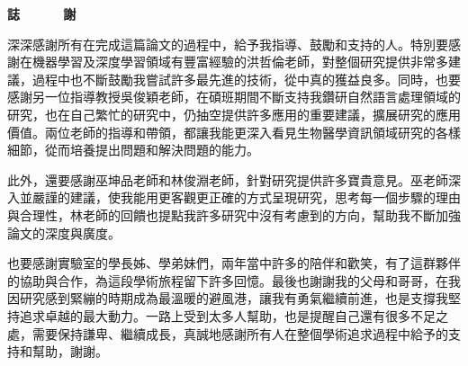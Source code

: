 
\begin{CJK*}{UTF8}{bkai}
\begin{center}
\Large
\textbf{誌~~~~~~謝}
\end{center}

\vspace{1cm}
\linespread{2}%
\selectfont
\hspace{0.25cm}
深深感謝所有在完成這篇論文的過程中，給予我指導、鼓勵和支持的人。特別要感謝在機器學習及深度學習領域有豐富經驗的洪哲倫老師，對整個研究提供非常多建議，過程中也不斷鼓勵我嘗試許多最先進的技術，從中真的獲益良多。同時，也要感謝另一位指導教授吳俊穎老師，在碩班期間不斷支持我鑽研自然語言處理領域的研究，也在自己繁忙的研究中，仍抽空提供許多應用的重要建議，擴展研究的應用價值。兩位老師的指導和帶領，都讓我能更深入看見生物醫學資訊領域研究的各樣細節，從而培養提出問題和解決問題的能力。

此外，還要感謝巫坤品老師和林俊淵老師，針對研究提供許多寶貴意見。巫老師深入並嚴謹的建議，使我能用更客觀更正確的方式呈現研究，思考每一個步驟的理由與合理性，林老師的回饋也提點我許多研究中沒有考慮到的方向，幫助我不斷加強論文的深度與廣度。

也要感謝實驗室的學長姊、學弟妹們，兩年當中許多的陪伴和歡笑，有了這群夥伴的協助與合作，為這段學術旅程留下許多回憶。最後也謝謝我的父母和哥哥，在我因研究感到緊繃的時期成為最溫暖的避風港，讓我有勇氣繼續前進，也是支撐我堅持追求卓越的最大動力。一路上受到太多人幫助，也是提醒自己還有很多不足之處，需要保持謙卑、繼續成長，真誠地感謝所有人在整個學術追求過程中給予的支持和幫助，謝謝。



\end{CJK*}
